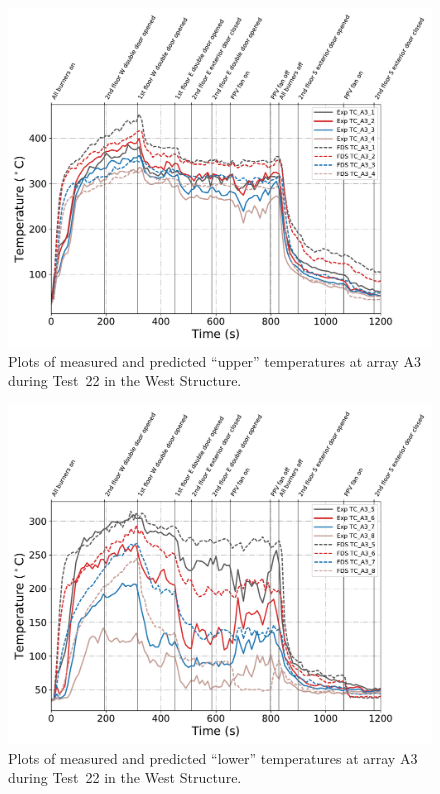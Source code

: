 \begin{figure}[!h]
	\centering
	\includegraphics[width=\columnwidth]{Figures/Plots/Validation/Temperature/Test_22_TC_A3_upper}
	\caption{Plots of measured and predicted ``upper'' temperatures at array A3 during Test~22 in the West Structure.}
	\label{fig:TCA3_upper_data_Test22}
\end{figure}
\begin{figure}[!h]
	\centering
	\includegraphics[width=\columnwidth]{Figures/Plots/Validation/Temperature/Test_22_TC_A3_lower}
	\caption{Plots of measured and predicted ``lower'' temperatures at array A3 during Test~22 in the West Structure.}
	\label{fig:TCA3_lower_data_Test22}
\end{figure}

